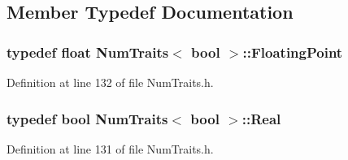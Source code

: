 \subsection{Member Typedef Documentation}
\hypertarget{struct_num_traits_3_01bool_01_4_af221c4109a329bd362fee9315cddc856}{
\subsubsection[{Floating\-Point}]{\setlength{\rightskip}{0pt plus 5cm}typedef {\bf float} {\bf Num\-Traits}$<$ bool $>$\-::{\bf Floating\-Point}}}\label{struct_num_traits_3_01bool_01_4_af221c4109a329bd362fee9315cddc856}


Definition at line 132 of file Num\-Traits.\-h.

\hypertarget{struct_num_traits_3_01bool_01_4_a3edc5999d3148734b78225951ea7ddcb}{
\subsubsection[{Real}]{\setlength{\rightskip}{0pt plus 5cm}typedef bool {\bf Num\-Traits}$<$ bool $>$\-::{\bf Real}}}\label{struct_num_traits_3_01bool_01_4_a3edc5999d3148734b78225951ea7ddcb}


Definition at line 131 of file Num\-Traits.\-h.



